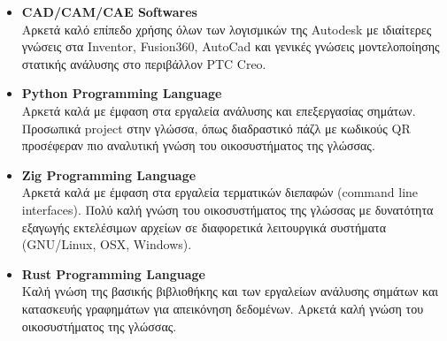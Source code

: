 \documentclass[a4paper,9pt]{extarticle}
\begin{document}
\begin{itemize}

{}
\item{\textbf{CAD/CAM/CAE Softwares}} \\
        Αρκετά καλό επίπεδο χρήσης όλων των λογισμικών της Autodesk με ιδιαίτερες γνώσεις στα Inventor, Fusion360, AutoCad και γενικές γνώσεις μοντελοποίησης στατικής ανάλυσης στο περιβάλλον PTC Creo. \\

\item{\textbf{Python Programming Language}} \\
        Αρκετά καλά με έμφαση στα εργαλεία ανάλυσης και επεξεργασίας σημάτων. Προσωπικά project στην γλώσσα, όπως διαδραστικό
        πάζλ με κωδικούς QR προσέφεραν πιο
        αναλυτική γνώση του οικοσυστήματος της γλώσσας. \\

\item{\textbf{Zig Programming Language}} \\
        Αρκετά καλά με έμφαση στα εργαλεία τερματικών διεπαφών (command line interfaces).
        Πολύ καλή γνώση του οικοσυστήματος της γλώσσας με δυνατότητα εξαγωγής
        εκτελέσιμων αρχείων σε διαφορετικά λειτουργικά συστήματα (GNU/Linux, OSX, Windows). \\

\item{\textbf{Rust Programming Language}} \\
        \noindent
        Καλή γνώση της βασικής βιβλιοθήκης και των εργαλείων ανάλυσης σημάτων
        και κατασκευής γραφημάτων για απεικόνηση δεδομένων.
        Αρκετά καλή γνώση του οικοσυστήματος της γλώσσας. \\

\end{itemize}
\end{document}
